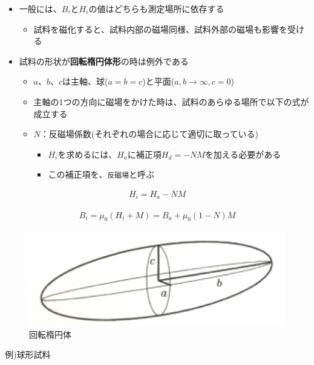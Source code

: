 \documentclass[11pt]{article}
\makeatletter
\def\maxwidth{\ifdim\Gin@nat@width>\linewidth\linewidth
    \else\Gin@nat@width\fi}
\let\Oldincludegraphics\includegraphics
\renewcommand{\includegraphics}[1]{\Oldincludegraphics[width=.8\maxwidth]{#1}}
\providecommand{\tightlist}{%
      \setlength{\itemsep}{0pt}\setlength{\parskip}{0pt}}
\makeatother
\begin{document}
    \begin{itemize}
\item
  一般には、\(B_i\)と\(H_i\)の値はどちらも測定場所に依存する

  \begin{itemize}
  \tightlist
  \item
    試料を磁化すると、試料内部の磁場同様、試料外部の磁場も影響を受ける
  \end{itemize}
\item
  試料の形状が\textbf{回転楕円体形}の時は例外である

  \begin{itemize}
  \item
    \(a\)、\(b\)、\(c\)は主軸、球(\(a=b=c\))と平面(\(a, b\rightarrow\infty, c=0\))
  \item
    主軸の1つの方向に磁場をかけた時は、試料のあらゆる場所で以下の式が成立する
  \item
    \(N\)：反磁場係数(それぞれの場合に応じて適切に取っている)

    \begin{itemize}
    \item
      \(H_i\)を求めるには、\(H_a\)に補正項\(H_d = - N M\)を加える必要がある
    \item
      この補正項を、\texttt{反磁場}と呼ぶ
    \end{itemize}
  \end{itemize}
\end{itemize}

\begin{eqnarray}
H_i = H_a - NM
\end{eqnarray}

\begin{eqnarray}
B_i = \mu_0(H_i + M) = B_a + \mu_0(1 - N)M
\end{eqnarray}

\begin{figure}
\centering
\includegraphics{./images/回転楕円体.png}
\caption{回転楕円体}
\end{figure}

    例)球形試料
\end{document}
